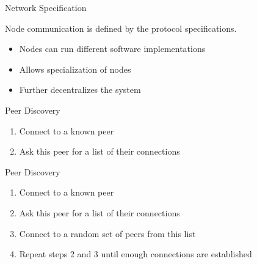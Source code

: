\documentclass[handout]{beamer}
\begin{document}
\begin{frame}{Network Specification}
	\begin{center}
		\begin{tikzpicture}[scale=0.7, every node/.style={scale=1}]
			
		\end{tikzpicture}
	\end{center}
	\vspace{.5 cm}
	
	Node communication is defined by the \color{focus}protocol specifications\color{black}.
	\begin{itemize}
		\item<2-> Nodes can run different software implementations
		\item<3-> Allows specialization of nodes
		\item<3-> \color{focus}Further decentralizes \color{black}the system
	\end{itemize}
\end{frame}

\begin{frame}{Peer Discovery}
	\begin{center}
		\begin{tikzpicture}[scale=1, every node/.style={scale=1}]
			
		\end{tikzpicture}
	\end{center}
	\begin{enumerate}
		\item<2-> Connect to a known peer
		\item<3-> Ask this peer for a list of their connections
	\end{enumerate}
\end{frame}

\begin{frame}{Peer Discovery}
	\begin{center}
		\begin{tikzpicture}[scale=1, every node/.style={scale=1}]
			
		\end{tikzpicture}
	\end{center}
	\begin{enumerate}
		\item Connect to a known peer
		\item Ask this peer for a list of their connections
		\item Connect to a random set of peers from this list
		\item<2-> Repeat steps 2 and 3 until enough connections are established
	\end{enumerate}
\end{frame}
\end{document}
